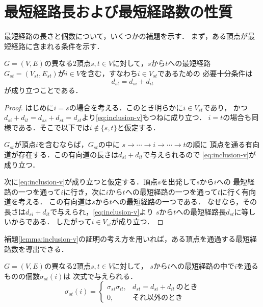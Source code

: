 \section{最短経路長および最短経路数の性質}
\label{sect:shortest-paths}

最短経路の長さと個数について，いくつかの補題を示す．
まず，ある頂点が最短経路に含まれる条件を示す．

\begin{lemma}
  \label{lemma:inclusion-v}
  $G=(V,E)$の異なる2頂点$s,t \in V$に対して，$s$から$t$への最短経路
  $G_{st}=(V_{st},E_{st})$が$i \in V$を含む，すなわち$i \in V_{st}$であるための
  必要十分条件は
  \begin{equation}
    d_{st}=d_{si}+d_{it}
    \label{eq:inclusion-v}
  \end{equation}
  が成り立つことである．
\end{lemma}
\begin{proof}
  はじめに$i=s$の場合を考える．このとき明らかに$i \in V_{st}$であり，
  かつ$d_{si}+d_{it}=d_{ss}+d_{st}=d_{st}$より\eqref{eq:inclusion-v}もつねに成り立つ．
  $i=t$の場合も同様である．そこで以下では$i \not\in \{s,t\}$と仮定する．

  $G_{st}$が頂点$i$を含むならば，$G_{st}$の中に
  $s \rightarrow \cdots \rightarrow i \rightarrow \cdots \rightarrow t$の順に
  頂点を通る有向道が存在する．この有向道の長さは$d_{si}+d_{it}$で与えられるので
  \eqref{eq:inclusion-v}が成り立つ．

  次に\eqref{eq:inclusion-v}が成り立つと仮定する．頂点$s$を出発して$s$から$i$への
  最短経路の一つを通って$i$に行き，次に$i$から$t$への最短経路の一つを通って$t$に行く有向道を考える．
  この有向道は$s$から$t$への最短経路の一つである．
  なぜなら，その長さは$d_{si}+d_{it}$で与えられ，\eqref{eq:inclusion-v}より
  $s$から$t$への最短経路長$d_{st}$に等しいからである．
  したがって$i \in V_{st}$が成り立つ．
\end{proof}

補題\ref{lemma:inclusion-v}の証明の考え方を用いれば，ある頂点を通過する最短経路数を導出できる．

\begin{lemma}
  $G=(V,E)$の異なる2頂点$s,t \in V$に対して，
  $s$から$t$への最短経路の中で$i$を通るものの個数$\sigma_{st}(i)$は
  次式で与えられる．
  \begin{equation}
    \sigma_{st}(i)=
    \begin{cases}
      \sigma_{si} \sigma_{it}, & d_{st}=d_{si}+d_{it}\,\text{のとき} \\
      0, & \text{それ以外のとき}
    \end{cases}
  \end{equation}
\end{lemma}

